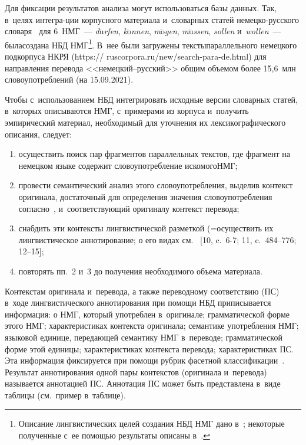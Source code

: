 \begin{multicols}{2}
  
Для фиксации результатов анализа могут использоваться базы данных. Так, 
в~целях интегра-\linebreak ции корпусного материала и~словарных статей
не\-мец\-ко-рус\-ско\-го словаря~\cite{6-go} для  
6~НМГ~--- \textit{d$\ddot{\mbox{u}}$rfen}, \textit{k$\ddot{\mbox{o}}$nnen}, 
\textit{m$\ddot{\mbox{o}}$gen}, \textit{m$\ddot{\mbox{u}}$ssen}, \textit{sollen} 
и~\textit{wollen}~--- была\linebreak создана НБД НМГ\footnote{Описание лингвистических целей 
создания НБД НМГ дано в~\cite{7-go}; некоторые полученные с~ее помощью результаты 
описаны в~\cite{8-go, 9-go}.}. В~нее были загружены тексты\linebreak параллельного немецкого 
подкорпуса НКРЯ  
({\sf https:// ruscorpora.ru/new/search-para-de.html}) для направления перевода  
<<не\-мец\-кий--рус\-ский>> общим объемом более 15,6~млн 
словоупотреблений (на 15.09.2021).

  Чтобы с~использованием НБД интегрировать исходные версии 
словарных статей, в~которых описываются НМГ, с~примерами из корпуса 
и~получить эмпирический материал, необходимый для уточнения их 
лексикографического описания, следует:
  \begin{enumerate}[(1)]
  \item осуществить поиск пар фрагментов параллельных текстов, где 
фрагмент на немецком языке содержит словоупотребление искомого\linebreak НМГ;
\item провести семантический анализ этого словоупотребления, 
выделив контекст оригинала, достаточный для определения значения 
словоупотребления согласно~\cite{6-go}, и~соответству\-ющий 
оригиналу контекст перевода;\\[-14.5pt]
\item снабдить эти контексты лингвистической разметкой 
(=\;осуществить их лингвистическое аннотирование; о его видах см.\ 
[10, c.~6-7; 11, c.~484--776; 12--15];\\[-14.5pt]
\item повторять пп.~2 и~3 до получения необходимого объема 
материала.\\[-14.5pt]
\end{enumerate}

  Контекстам оригинала и~перевода, а также переводному соответствию  
(ПС) в~ходе лингвистического аннотирования при помощи НБД 
приписывается информация: о НМГ, который употреблен в~оригинале; 
грамматической форме этого НМГ; характеристиках контекста оригинала; 
семантике употребления НМГ; языковой единице, пе\-ре\-да\-ющей семантику 
НМГ в~переводе; грамматической форме этой единицы; характеристиках 
контекста перевода; характеристиках ПС. Эта информация фиксируется при 
помощи рубрик фасетной классификации~\cite{16-go, 17-go}. Результат 
аннотирования одной пары контекстов (оригинала и~перевода) называется 
аннотацией ПС. Аннотация ПС может быть представлена в~виде таблицы 
(см.\ пример в~таб\-лице).
  


\end{multicols}
